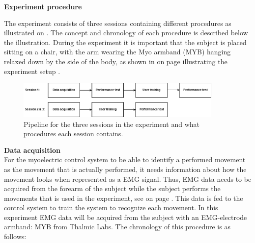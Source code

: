 \textbf{\Large{Experiment procedure}}

The experiment consists of three sessions containing different procedures as illustrated on . The concept and chronology of each procedure is described below the illustration. During the experiment it is important that the subject is placed sitting on a chair, with the arm wearing the Myo armband (MYB) hanging relaxed down by the side of the body, as shown in  on page \pageref{fig:experiment_setup} illustrating the experiment setup . 

\begin{figure}[H]                                         
	\includegraphics[width=0.9\textwidth]{figures/pMethods/experiment_protocol_pipeline}  
	\caption{Pipeline for the three sessions in the experiment and what procedures each session contains.}
	\label{fig:experiment_protocol_pipeline} 
\end{figure}


\textbf{Data acquisition} \\
For the myoelectric control system to be able to identify a performed movement as the movement that is actually performed, it needs information about how the movement looks when represented as a EMG signal. Thus, EMG data needs to be acquired from the forearm of the subject while the subject performs the movements that is used in the experiment, see  on page \pageref{fig:experiment_movements}. This data is fed to the control system to train the system to recognize each movement. In this experiment EMG data will be acquired from the subject with an EMG-electrode armband: MYB from Thalmic Labs. The chronology of this procedure is as follows:

